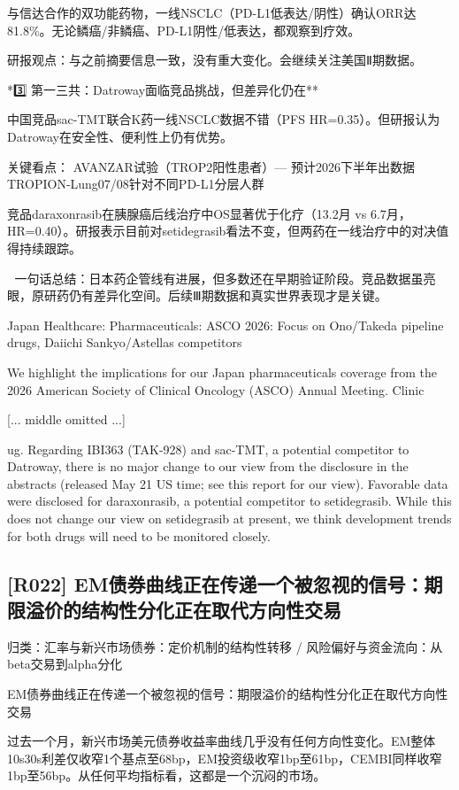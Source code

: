 \documentclass[11pt]{ctexart}
\begin{document}
与信达合作的双功能药物，一线NSCLC（PD-L1低表达/阴性）确认ORR达81.8\%。无论鳞癌/非鳞癌、PD-L1阴性/低表达，都观察到疗效。

研报观点：与之前摘要信息一致，没有重大变化。会继续关注美国Ⅱ期数据。

*3️⃣ 第一三共：Datroway面临竞品挑战，但差异化仍在**

中国竞品sac-TMT联合K药一线NSCLC数据不错（PFS HR=0.35）。但研报认为Datroway在安全性、便利性上仍有优势。

关键看点： AVANZAR试验（TROP2阳性患者）— 预计2026下半年出数据 TROPION-Lung07/08针对不同PD-L1分层人群

竞品daraxonrasib在胰腺癌后线治疗中OS显著优于化疗（13.2月 vs 6.7月，HR=0.40）。研报表示目前对setidegrasib看法不变，但两药在一线治疗中的对决值得持续跟踪。

📌 一句话总结：日本药企管线有进展，但多数还在早期验证阶段。竞品数据虽亮眼，原研药仍有差异化空间。后续Ⅲ期数据和真实世界表现才是关键。

Japan Healthcare: Pharmaceuticals: ASCO 2026: Focus on Ono/Takeda pipeline drugs, Daiichi Sankyo/Astellas competitors

We highlight the implications for our Japan pharmaceuticals coverage from the 2026 American Society of Clinical Oncology (ASCO) Annual Meeting. Clinic

[... middle omitted ...]

ug. Regarding IBI363 (TAK-928) and sac-TMT, a potential competitor to Datroway, there is no major change to our view from the disclosure in the abstracts (released May 21 US time; see this report for our view). Favorable data were disclosed for daraxonrasib, a potential competitor to setidegrasib. While this does not change our view on setidegrasib at present, we think development trends for both drugs will need to be monitored closely.

\subsection{[R022] EM债券曲线正在传递一个被忽视的信号：期限溢价的结构性分化正在取代方向性交易}
{\small\color{refgray}归类：汇率与新兴市场债券：定价机制的结构性转移 / 风险偏好与资金流向：从beta交易到alpha分化}

EM债券曲线正在传递一个被忽视的信号：期限溢价的结构性分化正在取代方向性交易

过去一个月，新兴市场美元债券收益率曲线几乎没有任何方向性变化。EM整体10s30s利差仅收窄1个基点至68bp，EM投资级收窄1bp至61bp，CEMBI同样收窄1bp至56bp。从任何平均指标看，这都是一个沉闷的市场。
\end{document}
